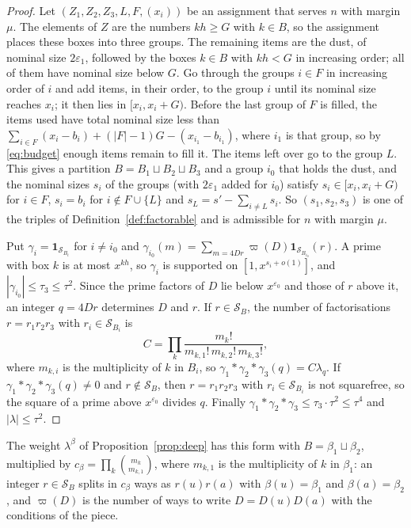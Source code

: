 \documentclass[aps,prd,twocolumn,superscriptaddress,nofootinbib,longbibliography,floatfix,showkeys,nobalancelastpage,amsmath,amssymb,10pt]{revtex4-2}
\theoremstyle{plain}
\theoremstyle{definition}
\theoremstyle{plain}
\newcommand{\eps}{\varepsilon}
\newcommand{\one}{\mathbf{1}}
\begin{document}
\begin{proof}
Let $(Z_1,Z_2,Z_3,L,F,(x_i))$ be an assignment that serves $n$ with margin $\mu$. The elements of $Z$ are the numbers $kh\ge G$ with $k\in B$, so the assignment places these boxes into three groups. The remaining items are the dust, of nominal size $2\eps_1$, followed by the boxes $k\in B$ with $kh<G$ in increasing order; all of them have nominal size below $G$. Go through the groups $i\in F$ in increasing order of $i$ and add items, in their order, to the group $i$ until its nominal size reaches $x_i$; it then lies in $[x_i,x_i+G)$. Before the last group of $F$ is filled, the items used have total nominal size less than $\sum_{i\in F}(x_i-b_i)+(|F|-1)G-(x_{i_1}-b_{i_1})$, where $i_1$ is that group, so by \eqref{eq:budget} enough items remain to fill it. The items left over go to the group $L$. This gives a partition $B=B_1\sqcup B_2\sqcup B_3$ and a group $i_0$ that holds the dust, and the nominal sizes $s_i$ of the groups (with $2\eps_1$ added for $i_0$) satisfy $s_i\in[x_i,x_i+G)$ for $i\in F$, $s_i=b_i$ for $i\notin F\cup\{L\}$ and $s_L=s'-\sum_{i\ne L}s_i$. So $(s_1,s_2,s_3)$ is one of the triples of Definition~\ref{def:factorable} and is admissible for $n$ with margin $\mu$.

Put $\gamma_i=\one_{\mathcal S_{B_i}}$ for $i\ne i_0$ and $\gamma_{i_0}(m)=\sum_{m=4Dr}\varpi(D)\one_{\mathcal S_{B_{i_0}}}(r)$. A prime with box $k$ is at most $x^{kh}$, so $\gamma_i$ is supported on $[1,x^{s_i+o(1)}]$, and $|\gamma_{i_0}|\le\tau_3\le\tau^2$. Since the prime factors of $D$ lie below $x^{\eps_0}$ and those of $r$ above it, an integer $q=4Dr$ determines $D$ and $r$. If $r\in\mathcal S_B$, the number of factorisations $r=r_1r_2r_3$ with $r_i\in\mathcal S_{B_i}$ is
\[
C=\prod_k\frac{m_k!}{m_{k,1}!\,m_{k,2}!\,m_{k,3}!},
\]
where $m_{k,i}$ is the multiplicity of $k$ in $B_i$, so $\gamma_1*\gamma_2*\gamma_3(q)=C\lambda_q$. If $\gamma_1*\gamma_2*\gamma_3(q)\ne0$ and $r\notin\mathcal S_B$, then $r=r_1r_2r_3$ with $r_i\in\mathcal S_{B_i}$ is not squarefree, so the square of a prime above $x^{\eps_0}$ divides $q$. Finally $\gamma_1*\gamma_2*\gamma_3\le\tau_3\cdot\tau^2\le\tau^4$ and $|\lambda|\le\tau^2$.
\end{proof}

The weight $\lambda^\beta$ of Proposition~\ref{prop:deep} has this form with $B=\beta_1\sqcup\beta_2$, multiplied by $c_\beta=\prod_k\binom{m_k}{m_{k,1}}$, where $m_{k,1}$ is the multiplicity of $k$ in $\beta_1$: an integer $r\in\mathcal S_B$ splits in $c_\beta$ ways as $r(u)r(a)$ with $\beta(u)=\beta_1$ and $\beta(a)=\beta_2$, and $\varpi(D)$ is the number of ways to write $D=D(u)D(a)$ with the conditions of the piece.
\end{document}
